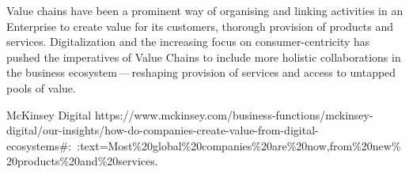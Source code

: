 %
%

Value chains have been a prominent way of organising and linking activities in an Enterprise to create value
for its customers, thorough provision of products and services.
Digitalization and the increasing focus on consumer-centricity
has pushed the imperatives of Value Chains to include more holistic collaborations in the
business ecosystem\,---\,reshaping provision of services and access to untapped pools of value.

{McKinsey Digital}
{https://www.mckinsey.com/business-functions/mckinsey-digital/our-insights/how-do-companies-create-value-from-digital-ecosystems\#:~:text=Most\%20global\%20companies\%20are\%20now,from\%20new\%20products\%20and\%20services.}




